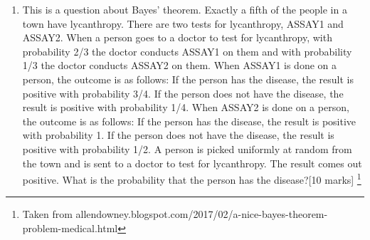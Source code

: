 \documentclass[11pt,a4paper]{scrartcl}
\newif\ifanswers
\begin{document}
\begin{enumerate}
\begin{enumerate}
\end{enumerate}
  
\ifanswers
\textbf{Answer}:\\
  \textbf{a)} So there are 36 possible pairs of face values, each equally likes, of these 6+1, 5+2, 4+3, 3+4, 2+5 and 1+6 add to seven, so the probability of rolling a seven is 1/6.\\
  \textbf{b)} win is 1/6+1/18 since there are two ways to make 11: 5+6 and 6+5, this is 4/18=2/9. lose is 1/36+1/18+1/36 which is 1/9 and by subtraction this leave 2/3 as the chance of going on to the next phase of the game.\\
  \textbf{c)} So using Bayes rule
  \begin{equation}
    P(4|4\|7)=\frac{P(4\|7|4)P(4)}{P(4\|7)}
  \end{equation}
  with $P(4)=3/36$ and $P(7)=6/36$ and $P(4\|7|4)=1$ hence
  \begin{equation}
    P(4|4\|7)=3/(3+6)=1/3
  \end{equation}
  \textbf{d)} There are two ways of winning, either from the come out roll or a subsequent roll, which must be summed over the possible point values. 
  \begin{equation}
    P(\mbox{first roll is 11 or seven})+\sum_{4,5,6,8,9,10} P_iQ_i=\frac{2}{9}+\sum_{4,5,6,8,9,10} P_iQ_i
  \end{equation}
  \textbf{e)} So
  \begin{equation}
    \frac{2}{9}+\frac{1}{3}\frac{1}{12}+\frac{2}{5}\frac{1}{9}+\frac{5}{11}\frac{5}{36}+\frac{5}{11}\frac{5}{36}\frac{2}{5}\frac{1}{9}+\frac{1}{3}\frac{1}{12}\approx 0.49
  \end{equation}
[each part has 4 marks with 4 for completely correct, 3 for correct with numerical error, 2 for right idea but not implemented, 1 for some idea].
  \fi
  
\item This is a question about Bayes' theorem.  Exactly a fifth of the
  people in a town have lycanthropy. There are two tests for
  lycanthropy, ASSAY1 and ASSAY2. When a person goes to a doctor
  to test for lycanthropy, with probability 2/3 the doctor conducts
  ASSAY1 on them and with probability 1/3 the doctor conducts ASSAY2
  on them. When ASSAY1 is done on a person, the outcome is as follows:
  If the person has the disease, the result is positive with
  probability 3/4. If the person does not have the disease, the result
  is positive with probability 1/4. When ASSAY2 is done on a person,
  the outcome is as follows: If the person has the disease, the result
  is positive with probability 1. If the person does not have the
  disease, the result is positive with probability 1/2. A person is
  picked uniformly at random from the town and is sent to a doctor to
  test for lycanthropy. The result comes out positive. What is the
  probability that the person has the disease?[10 marks] \footnote{Taken from allendowney.blogspot.com/2017/02/a-nice-bayes-theorem-problem-medical.html}


\end{enumerate}
\end{document}
